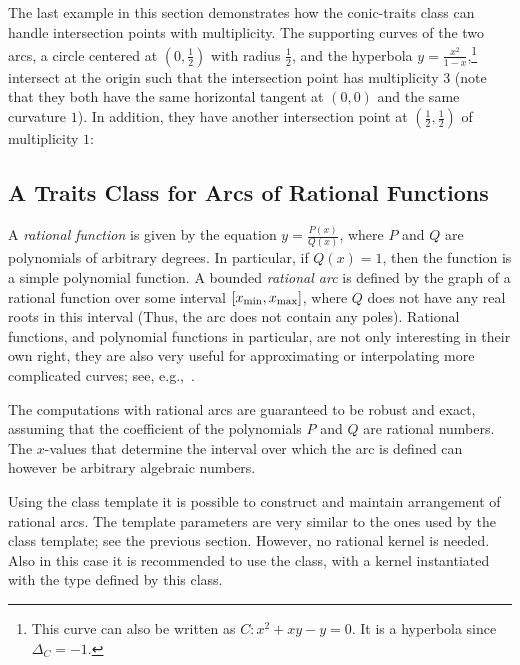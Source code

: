 
The last example in this section demonstrates how the conic-traits
class can handle intersection points with multiplicity. The
supporting curves of the two arcs, a circle centered at
$(0,\frac{1}{2})$ with radius $\frac{1}{2}$, and the hyperbola $y
= \frac{x^2}{1-x}$,\footnote{This curve can also be written as $C:
x^2 + xy - y = 0$. It is a hyperbola since $\Delta_{C} = -1$.}
intersect at the origin such that the intersection point has
multiplicity $3$ (note that they both have the same horizontal
tangent at $(0,0)$ and the same curvature $1$). In addition, they
have another intersection point at $(\frac{1}{2},\frac{1}{2})$ of
multiplicity $1$:


\subsection{A Traits Class for Arcs of Rational Functions}
\label{arr_ssec:tr_ratfunc}

A {\em rational function} is given by the equation $y =
\frac{P(x)}{Q(x)}$, where $P$ and $Q$ are polynomials of arbitrary
degrees. In particular, if $Q(x) = 1$, then the function is a
simple polynomial function. A bounded {\em rational arc} is
defined by the graph of a rational function over some interval
$[x_{\rm min}, x_{\rm max}]$, where $Q$ does not have any real
roots in this interval (Thus, the arc does not contain any poles).
Rational functions, and polynomial functions in particular, are
not only interesting in their own right, they are also very useful
for approximating or interpolating more complicated curves; see,
e.g.,~\cite[Chapter~3]{cgal:ptvf-nrcpp-02}.

The computations with rational arcs are guaranteed to be robust and 
exact, assuming that the coefficient of the polynomials $P$ and $Q$
are rational  numbers. The $x$-values that determine the interval
over which the arc is defined can however be arbitrary algebraic
numbers.

Using the  class
template it is possible to construct and maintain arrangement of
rational arcs. The template parameters are very similar to the
ones used by the  class template; see
the previous section. However, no rational kernel is needed. Also
in this case it is recommended to use the
 class, with a kernel instantiated
with the  type defined by this class.

